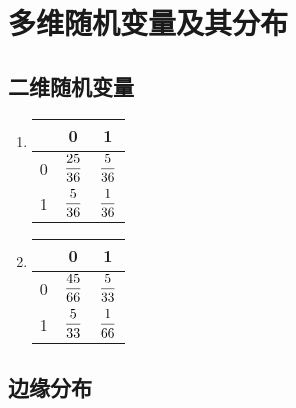 \section{多维随机变量及其分布}
\subsection{二维随机变量}
\begin{prob}
	\begin{enumerate}
	\item 	
	\renewcommand{\arraystretch}{1.7}
	\begin{tabular}{c|cc}
		\hline
		\backslashbox{$Y$}{$X$}&0&1\\
		\hline
		0& $\displaystyle\frac{25}{36}$& $\displaystyle\frac{5}{36}$\\
		1& $\displaystyle\frac{5}{36}$ & $\displaystyle\frac{1}{36}$\\
		\hline
	\end{tabular}
	\item 	
		\begin{tabular}{c|cc}
			\hline
			\backslashbox{$Y$}{$X$}&0&1\\
			\hline
			0& $\displaystyle\frac{45}{66}$& $\displaystyle\frac{5}{33}$\\
			1& $\displaystyle\frac{5}{33}$& $\displaystyle\frac{1}{66}$\\
			\hline
		\end{tabular}
	\end{enumerate}
\end{prob}
\subsection{边缘分布}
\setcounter{prob}{5}
\begin{prob}

\end{prob}
